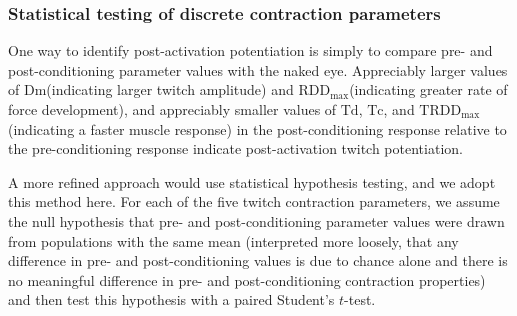 \documentclass[utf8]{FrontiersinHarvard}
\newcommand{\Dm}{\ensuremath{\text{Dm}}\xspace}
\newcommand{\Td}{\ensuremath{\text{Td}}\xspace}
\newcommand{\Tc}{\ensuremath{\text{Tc}}\xspace}
\newcommand{\RDDMax}{\ensuremath{ \text{RDD}_{\text{max}}}\xspace}
\newcommand{\RDDMaxTime}{\ensuremath{ \text{TRDD}_{\text{max}}}\xspace}
\begin{document}
\subsubsection{Statistical testing of discrete contraction parameters} \label{sss:discrete_twitch_param_stats}
One way to identify post-activation potentiation is simply to compare pre- and post-conditioning parameter values with the naked eye.
Appreciably larger values of \Dm (indicating larger twitch amplitude) and \RDDMax (indicating greater rate of force development), and appreciably smaller values of \Td, \Tc, and \RDDMaxTime (indicating a faster muscle response) in the post-conditioning response relative to the pre-conditioning response indicate post-activation twitch potentiation.

A more refined approach would use statistical hypothesis testing, and we adopt this method here.
For each of the five twitch contraction parameters, we assume the null hypothesis that pre- and post-conditioning parameter values were drawn from populations with the same mean
(interpreted more loosely, that any difference in pre- and post-conditioning values is due to chance alone and there is no meaningful difference in pre- and post-conditioning contraction properties)
and then test this hypothesis with a paired Student's $ t $-test.
\end{document}
